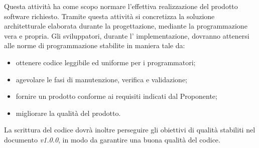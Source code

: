     Questa attività ha come scopo normare l'effettiva realizzazione del prodotto software richiesto. Tramite questa attività si concretizza la soluzione architetturale elaborata durante la progettazione, mediante la programmazione vera e propria.    
    Gli sviluppatori, durante l' implementazione, dovranno attenersi alle norme di programmazione stabilite in maniera tale da: 
    \begin{itemize}
       	\item ottenere codice leggibile ed uniforme per i programmatori; 
       	\item agevolare le fasi di manutenzione, verifica e validazione;
       	\item fornire un prodotto conforme ai requisiti indicati dal Proponente; 
       	\item migliorare la qualità del prodotto.
   	\end{itemize} 

   	\noindent La scrittura del codice dovrà inoltre perseguire gli obiettivi di qualità stabiliti nel documento \textit{\PdQ{} v1.0.0}, in modo da garantire una buona qualità del codice. 
